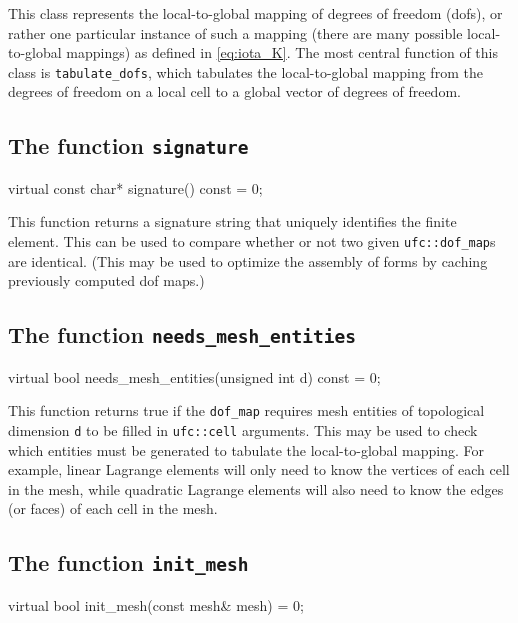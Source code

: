 This class represents the local-to-global mapping of degrees of
freedom (dofs), or rather one particular instance of such a mapping
(there are many possible local-to-global mappings) as defined in
\eqref{eq:iota_K}.  The most central function of this class is
\texttt{tabulate\_dofs}, which tabulates the local-to-global mapping
from the degrees of freedom on a local cell to a global vector of
degrees of freedom.

\subsection{The function \texttt{signature}}

\begin{code}
virtual const char* signature() const = 0;
\end{code}

This function returns a signature string that uniquely identifies the
finite element. This can be used to compare whether or not two given
\texttt{ufc::dof\_map}s are identical. (This may be used to optimize
the assembly of forms by caching previously computed dof maps.)

\subsection{The function \texttt{needs\_mesh\_entities}}

\begin{code}
virtual bool needs_mesh_entities(unsigned int d) const = 0;
\end{code}

This function returns true if the \texttt{dof\_map} requires mesh
entities of topological dimension \texttt{d} to be filled in
\texttt{ufc::cell} arguments. This may be used to check which entities
must be generated to tabulate the local-to-global mapping. For
example, linear Lagrange elements will only need to know the vertices
of each cell in the mesh, while quadratic Lagrange elements will also
need to know the edges (or faces) of each cell in the mesh.

\subsection{The function \texttt{init\_mesh}}

\begin{code}
virtual bool init_mesh(const mesh& mesh) = 0;
\end{code}

